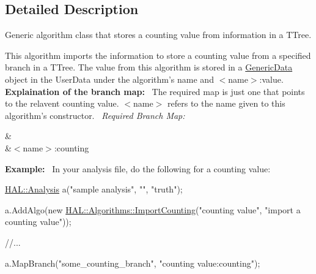 \subsection{Detailed Description}
Generic algorithm class that stores a counting value from information in a T\+Tree. 

This algorithm imports the information to store a counting value from a specified branch in a T\+Tree. The value from this algorithm is stored in a \hyperlink{class_h_a_l_1_1_generic_data}{Generic\+Data} object in the User\+Data under the algorithm's name and $<$name$>$\+:value.~\newline
~\newline
{\bfseries Explaination of the branch map\+:}~\newline
The required map is just one that points to the relavent counting value. $<$name$>$ refers to the name given to this algorithm's constructor.~\newline
{\itshape Required Branch Map\+:} \begin{TabularC}{2}
\hline
{}&\PBS{}\\
&\PBS\centering $<$name$>$\+:counting \\
\end{TabularC}
{\bfseries Example\+:}~\newline
In your analysis file, do the following for a counting value\+:


\begin{DoxyCode}
\hyperlink{class_h_a_l_1_1_analysis}{HAL::Analysis} a(\textcolor{stringliteral}{"sample analysis"}, \textcolor{stringliteral}{""}, \textcolor{stringliteral}{"truth"});

a.AddAlgo(\textcolor{keyword}{new} \hyperlink{class_h_a_l_1_1_algorithms_1_1_import_counting}{HAL::Algorithms::ImportCounting}(\textcolor{stringliteral}{"counting value"}, \textcolor{stringliteral}{"import a
       counting value"}));

\textcolor{comment}{//...}

a.MapBranch(\textcolor{stringliteral}{"some\_counting\_branch"}, \textcolor{stringliteral}{"counting value:counting"});
\end{DoxyCode}
 

